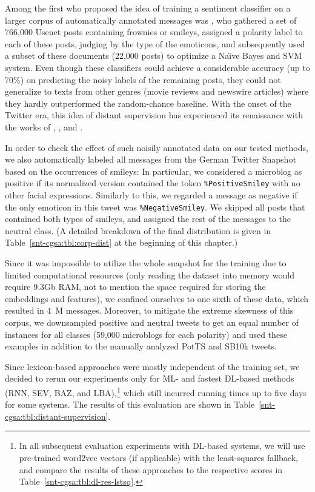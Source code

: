 Among the first who proposed the idea of training a sentiment
classifier on a larger corpus of automatically annotated messages was
\citet{Read:05}, who gathered a set of 766,000 Usenet posts containing
frownies or smileys, assigned a polarity label to each of these posts,
judging by the type of the emoticons, and subsequently used a subset
of these documents (22,000 posts) to optimize a Na\"{\i}ve Bayes and
SVM system.  Even though these classifiers could achieve a
considerable accuracy (up to 70\%) on predicting the noisy labels of
the remaining posts, they could not generalize to texts from other
genres (movie reviews and newswire articles) where they hardly
outperformed the random-chance baseline. With the onset of the Twitter
era, this idea of distant supervision has experienced its renaissance
with the works of \citet{Go:09}, \citet{Pak:10}, and
\citet{Barbosa:10}.

In order to check the effect of such noisily annotated data on our
tested methods, we also automatically labeled all messages from the
German Twitter Snapshot~\cite{Scheffler:14} based on the occurrences
of smileys: In particular, we considered a microblog as positive if
its normalized version contained the token \texttt{\%PositiveSmiley}
with no other facial expressions.  Similarly to this, we regarded a
message as negative if the only emoticon in this tweet was
\texttt{\%NegativeSmiley}.  We skipped all posts that contained both
types of smileys, and assigned the rest of the messages to the neutral
class. (A detailed breakdown of the final distribution is given in
Table~\ref{snt-cgsa:tbl:corp-dist} at the beginning of this chapter.)

Since it was impossible to utilize the whole snapshot for the training
due to limited computational resources (only reading the dataset into
memory would require 9.3Gb RAM, not to mention the space required for
storing the embeddings and features), we confined ourselves to one
sixth of these data, which resulted in 4~M messages.  Moreover, to
mitigate the extreme skewness of this corpus, we downsampled positive
and neutral tweets to get an equal number of instances for all classes
(59,000 microblogs for each polarity) and used these examples in
addition to the manually analyzed PotTS and SB10k tweets.

Since lexicon-based approaches were mostly independent of the training
set, we decided to rerun our experiments only for ML- and fastest
DL-based methods (RNN, SEV, BAZ, and LBA),\footnote{In all subsequent
  evaluation experiments with DL-based systems, we will use
  pre-trained word2vec vectors (if applicable) with the least-squares
  fallback, and compare the results of these approaches to the
  respective scores in Table~\ref{snt-cgsa:tbl:dl-res-lstsq}.} which
still incurred running times up to five days for some systems.  The
results of this evaluation are shown in
Table~\ref{snt-cgsa:tbl:distant-supervision}.

